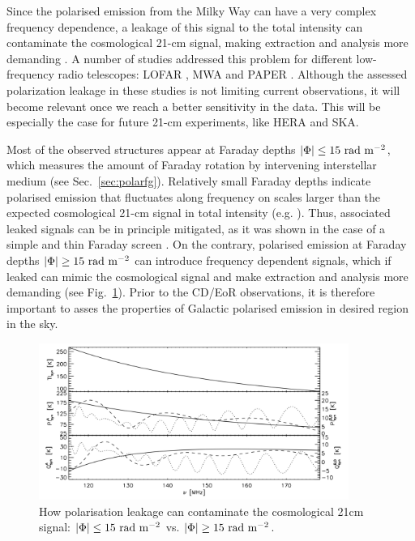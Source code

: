 Since the polarised emission from the Milky Way can have a very complex frequency dependence, a leakage of this signal to the total intensity can contaminate the cosmological 21-cm signal, making extraction and analysis more demanding \cite{jelic10, moore13}. A number of studies addressed this problem for different low-frequency radio telescopes: LOFAR \cite{asad15, asad16, asad18},  MWA \cite{sutinjo15} and PAPER \cite{kohn16}.  Although the assessed polarization leakage in these studies is not limiting current  observations, it will become relevant once we reach a better sensitivity in the data. This will be especially the case for future 21-cm experiments, like HERA and SKA. 

Most of the observed structures appear at Faraday depths $|\Phi|\leq15~{\rm rad~m^{-2}}$, which measures the amount of Faraday rotation by
intervening interstellar medium (see Sec.~\ref{sec:polarfg}). Relatively small Faraday depths indicate polarised emission that fluctuates along frequency on scales  larger than 
the expected cosmological 21-cm signal  in total intensity (e.g. \cite{moore13}). Thus, associated leaked signals can be in principle mitigated, as it was shown in the case of a simple and  thin Faraday screen \cite{geil11}. On the contrary, polarised emission at Faraday depths $|\Phi|\geq15~{\rm rad~m^{-2}}$ can introduce frequency dependent signals, which if leaked can mimic the cosmological signal and make extraction and analysis more demanding (see Fig.~\ref{fig:leakage}).  Prior to the CD/EoR observations, it is therefore important to asses the properties of Galactic polarised emission in desired region in the sky. 

\begin{figure}[!h]
   \centering	
   \includegraphics[width=0.9\textwidth]{Chapman_Jelic/Images/leakage.png}
    \caption{How polarisation leakage can contaminate the cosmological 21cm signal: $|\Phi|\leq15~{\rm rad~m^{-2}}$ vs. $|\Phi|\geq15~{\rm rad~m^{-2}}$.}
    \label{fig:leakage}
\end{figure}

